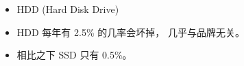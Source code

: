 
\begin{issues}
\issueDraft
\end{issues}

\begin{itemize}
\item HDD (Hard Disk Drive)
\item HDD 每年有 2.5\% 的几率会坏掉， 几乎与品牌无关。
\item 相比之下 SSD 只有 0.5\%。
\end{itemize}
